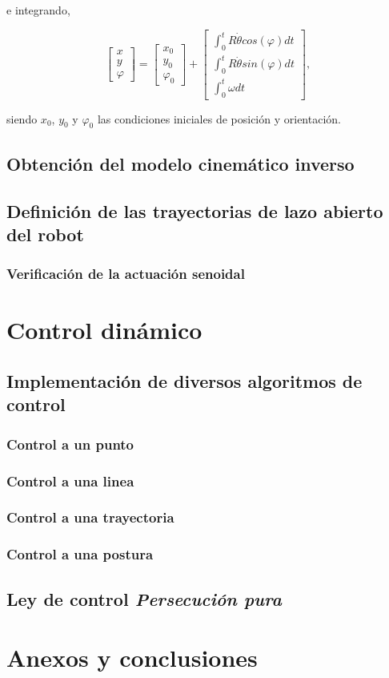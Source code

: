 \documentclass[a4paper,twoside]{article}
\begin{document}
	e integrando,
	
		$$
		\begin{bmatrix}
		x\\y\\\varphi
		\end{bmatrix}
		=
		\begin{bmatrix}
		x_0\\y_0\\\varphi_0
		\end{bmatrix}
		+
		\begin{bmatrix}
		\int_{0}^{t} R\dot{\theta}cos(\varphi)dt\\
		\int_{0}^{t} R\dot{\theta}sin(\varphi)dt\\
		\int_{0}^{t} \omega dt
		\end{bmatrix},
		$$
	
	siendo $x_0$, $y_0$ y $\varphi_0$ las condiciones iniciales de posición y orientación.


	\subsection{Obtención del modelo cinemático inverso}
	\subsection{Definición de las trayectorias de lazo abierto del robot}
		\subsubsection{Verificación de la actuación senoidal}

\section{Control dinámico}
	\subsection{Implementación de diversos algoritmos de control}
		\subsubsection{Control a un punto}
		\subsubsection{Control a una linea}
		\subsubsection{Control a una trayectoria}
		\subsubsection{Control a una postura}
	\subsection{Ley de control \textit{Persecución pura}}

\section{Anexos y conclusiones}
\end{document}
